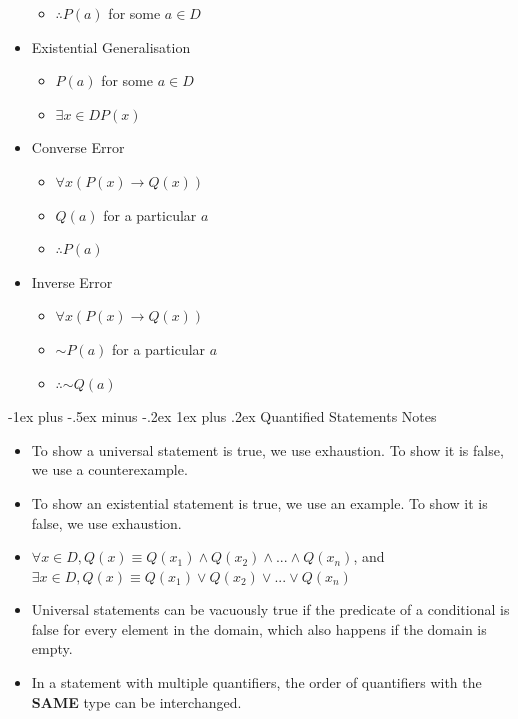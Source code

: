 \documentclass[10pt, portrait]{article}
\makeatletter
\renewcommand{\subsection}{\@startsection{subsection}{3}{0mm}%
                                {-1ex plus -.5ex minus -.2ex}%
                                {1ex plus .2ex}%
                                {\normalfont\small\bfseries}}%
\renewcommand{\lnot}{\mathord{\sim}}
\makeatother
\begin{document}
\begin{multicols*}{2}
\begin{multicols*}{2}
\begin{itemize}
\begin{itemize}
        \item $\therefore P(a)$ for some  $a \in D$
    \end{itemize}
    \item Existential Generalisation
    \begin{itemize}
        \item $P(a)$ for some $a \in D$
        \item $\exists x \in D P(x)$
    \end{itemize}
    \item Converse Error
    \begin{itemize}
        \item $\forall x (P(x) \rightarrow Q(x))$
        \item $Q(a)$ for a particular $a$
        \item $\therefore P(a)$
    \end{itemize}
    \item Inverse Error
    \begin{itemize}
        \item $\forall x (P(x) \rightarrow Q(x))$
        \item $\lnot P(a)$ for a particular $a$
        \item $\therefore \lnot Q(a)$
    \end{itemize}
\end{itemize}
\end{multicols*}

\subsection{Quantified Statements Notes}
\begin{itemize}
    \item To show a universal statement is true, we use exhaustion. To show it is false, we use a counterexample.
    \item To show an existential statement is true, we use an example. To show it is false, we use exhaustion.
    \item $\forall x \in D, Q(x) \equiv Q(x_1) \land Q(x_2) \land ... \land Q(x_n)$, and $\exists x \in D, Q(x) \equiv Q(x_1) \lor Q(x_2) \lor ... \lor Q(x_n)$
    \item Universal statements can be vacuously true if the predicate of a conditional is false for every element in the domain, which also happens if the domain is empty.
    \item In a statement with multiple quantifiers, the order of quantifiers with the \textbf{SAME} type can be interchanged.
\end{itemize}


\end{multicols*}
\end{document}
